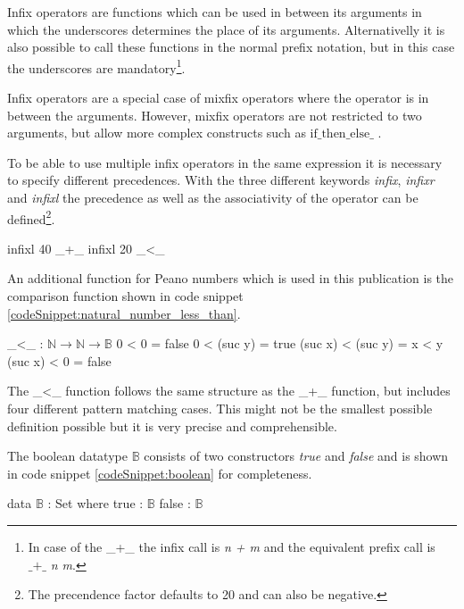 Infix operators are functions which can be used in between its arguments in which the underscores determines the place of its arguments.
Alternativelly it is also possible to call these functions in the normal prefix notation, but in this case the underscores are mandatory\footnote{In case of the \_+\_ the infix call is \emph{n + m} and the equivalent prefix call is $\text{\_+\_}$ \emph{n m}.}.

Infix operators are a special case of mixfix operators where the operator is in between the arguments.
However, mixfix operators are not restricted to two arguments, but allow more complex constructs such as $\text{if\_then\_else\_}$ \cite{AgdaReadTheDocs}.

To be able to use multiple infix operators in the same expression it is necessary to specify different precedences.
With the three different keywords \emph{infix}, \emph{infixr} and \emph{infixl} the precedence as well as the associativity of the operator can be defined\footnote{The precendence factor defaults to 20 and can also be negative.}.

\begin{codesnippet}[mathescape=true, caption={Precedence and associativity of some Peano number operators}, label={codeSnippet:natural_number_precedence}]
infixl 40 _+_
infixl 20 _<_
\end{codesnippet}

An additional function for Peano numbers which is used in this publication is the comparison function shown in code snippet \ref{codeSnippet:natural_number_less_than}.

\begin{codesnippet}[mathescape=true, caption={Peano numbers less-than}, label={codeSnippet:natural_number_less_than}]
_<_ : $\mathbb{N} \rightarrow \mathbb{N} \rightarrow \mathbb{B}$
0 < 0 = false
0 < (suc y) = true
(suc x) < (suc y) = x < y
(suc x) < 0 = false
\end{codesnippet}

The \_\textless\_ function follows the same structure as the \_+\_ function, but includes four different pattern matching cases. 
This might not be the smallest possible definition possible but it is very precise and comprehensible.

The boolean datatype $\mathbb{B}$ consists of two constructors \emph{true} and \emph{false} and is shown in code snippet \ref{codeSnippet:boolean} for completeness.

\begin{codesnippet}[mathescape=true, caption={Definition of the boolean datatype in Agda}, label={codeSnippet:boolean}]
data $\mathbb{B}$ : Set where
  true : $\mathbb{B}$
  false  : $\mathbb{B}$
\end{codesnippet}

